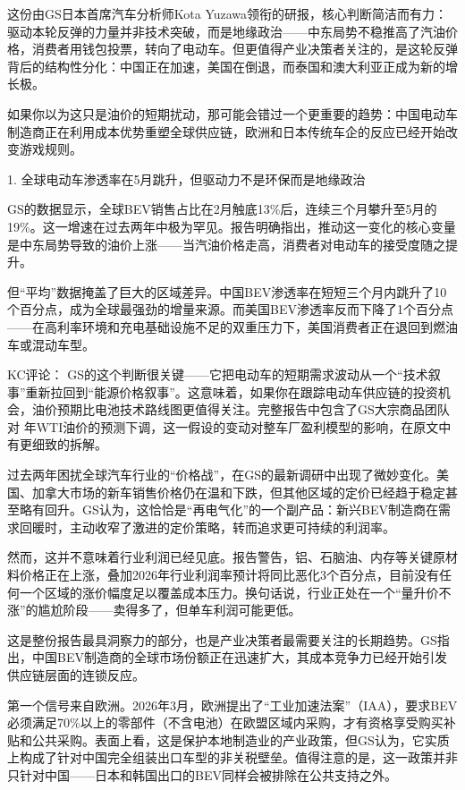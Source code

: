 \documentclass[11pt]{ctexart}
\begin{document}
这份由GS日本首席汽车分析师Kota Yuzawa领衔的研报，核心判断简洁而有力：驱动本轮反弹的力量并非技术突破，而是地缘政治——中东局势不稳推高了汽油价格，消费者用钱包投票，转向了电动车。但更值得产业决策者关注的，是这轮反弹背后的结构性分化：中国正在加速，美国在倒退，而泰国和澳大利亚正成为新的增长极。

如果你以为这只是油价的短期扰动，那可能会错过一个更重要的趋势：中国电动车制造商正在利用成本优势重塑全球供应链，欧洲和日本传统车企的反应已经开始改变游戏规则。

1. 全球电动车渗透率在5月跳升，但驱动力不是环保而是地缘政治

GS的数据显示，全球BEV销售占比在2月触底13\%后，连续三个月攀升至5月的19\%。这一增速在过去两年中极为罕见。报告明确指出，推动这一变化的核心变量是中东局势导致的油价上涨——当汽油价格走高，消费者对电动车的接受度随之提升。

但“平均”数据掩盖了巨大的区域差异。中国BEV渗透率在短短三个月内跳升了10个百分点，成为全球最强劲的增量来源。而美国BEV渗透率反而下降了1个百分点——在高利率环境和充电基础设施不足的双重压力下，美国消费者正在退回到燃油车或混动车型。

KC评论： GS的这个判断很关键——它把电动车的短期需求波动从一个“技术叙事”重新拉回到“能源价格叙事”。这意味着，如果你在跟踪电动车供应链的投资机会，油价预期比电池技术路线图更值得关注。完整报告中包含了GS大宗商品团队对 年WTI油价的预测下调，这一假设的变动对整车厂盈利模型的影响，在原文中有更细致的拆解。

过去两年困扰全球汽车行业的“价格战”，在GS的最新调研中出现了微妙变化。美国、加拿大市场的新车销售价格仍在温和下跌，但其他区域的定价已经趋于稳定甚至略有回升。GS认为，这恰恰是“再电气化”的一个副产品：新兴BEV制造商在需求回暖时，主动收窄了激进的定价策略，转而追求更可持续的利润率。

然而，这并不意味着行业利润已经见底。报告警告，铝、石脑油、内存等关键原材料价格正在上涨，叠加2026年行业利润率预计将同比恶化3个百分点，目前没有任何一个区域的涨价幅度足以覆盖成本压力。换句话说，行业正处在一个“量升价不涨”的尴尬阶段——卖得多了，但单车利润可能更低。

这是整份报告最具洞察力的部分，也是产业决策者最需要关注的长期趋势。GS指出，中国BEV制造商的全球市场份额正在迅速扩大，其成本竞争力已经开始引发供应链层面的连锁反应。

第一个信号来自欧洲。2026年3月，欧洲提出了“工业加速法案”（IAA），要求BEV必须满足70\%以上的零部件（不含电池）在欧盟区域内采购，才有资格享受购买补贴和公共采购。表面上看，这是保护本地制造业的产业政策，但GS认为，它实质上构成了针对中国完全组装出口车型的非关税壁垒。值得注意的是，这一政策并非只针对中国——日本和韩国出口的BEV同样会被排除在公共支持之外。
\end{document}
